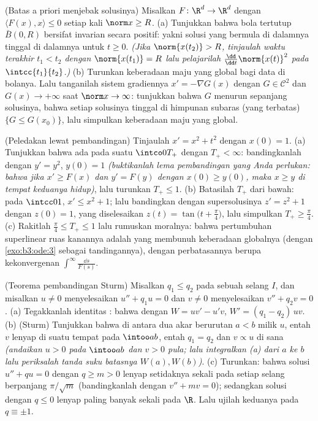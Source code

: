 \begin{exercise}[$\star\star\star$]\label{exo:b3:ode:10}
(Batas a priori menjebak solusinya) Misalkan $F \colon \R^d \to \R^d$
 dengan $\langle F(x), x\rangle \leq 0$
setiap kali $\norm x \geq R$.
(a) Tunjukkan bahwa bola tertutup $\bar B(0, R)$ bersifat invarian
secara positif: yakni solusi yang bermula di dalamnya tinggal di dalamnya untuk $t \geq
0$. \emph{(Jika $\norm{x(t_2)} > R$, tinjaulah waktu terakhir
$t_1 < t_2$ dengan $\norm{x(t_1)} = R$ lalu pelajarilah
$\frac{\dd}{\dd t}\norm{x(t)}^2$ pada $\intcc{t_1}{t_2}$.)}
(b) Turunkan keberadaan maju yang global bagi data di bolanya.
Lalu tanganilah sistem gradiennya $x' = -\nabla G(x)$ dengan $G \in
\mathcal C^2$ dan $G(x) \to +\infty$ saat $\norm x \to
\infty$: tunjukkan bahwa $G$ menurun sepanjang solusinya, bahwa setiap
solusinya tinggal di himpunan subaras (yang terbatas) $\{G \leq
G(x_0)\}$, lalu simpulkan keberadaan maju yang global.
\end{exercise}

\begin{exercise}[$\star\star$]\label{exo:b3:ode:11}
(Peledakan lewat pembandingan) Tinjaulah $x' = x^2 + t^2$ dengan $x(0) =
1$.
(a) Tunjukkan bahwa  ada pada suatu $\intco0{T_+}$
dengan $T_+ < \infty$: bandingkanlah dengan $y' = y^2$, $y(0) = 1$
\emph{(buktikanlah lema pembandingan yang Anda perlukan: bahwa jika $x' \geq
F(x)$ dan $y' = F(y)$ dengan $x(0) \geq y(0)$, maka $x \geq
y$ di tempat keduanya hidup)}, lalu turunkan $T_+ \leq 1$.
(b) Batasilah $T_+$ dari bawah: pada $\intcc01$, $x' \leq x^2 +
1$; lalu bandingkan dengan supersolusinya $z' = z^2 + 1$ dengan $z(0) =
1$, yang diselesaikan $z(t) = \tan\bigl(t + \frac\pi4\bigr)$, lalu
simpulkan $T_+ \geq \frac\pi4$.
(c) Rakitlah $\frac\pi4 \leq T_+ \leq 1$ lalu rumuskan
moralnya: bahwa pertumbuhan superlinear ruas kanannya adalah yang
membunuh keberadaan globalnya (dengan \cref{exo:b3:ode:3} sebagai
tandingannya), dengan perbatasannya berupa kekonvergenan
$\int^{\infty}\frac{\dd s}{F(s)}$.
\end{exercise}

\begin{exercise}[$\star\star\star$]\label{exo:b3:ode:12}
(Teorema pembandingan Sturm) Misalkan $q_1 \leq q_2$ 
pada sebuah selang $I$, dan misalkan $u \neq 0$ menyelesaikan $u''
+ q_1u = 0$ dan $v \neq 0$ menyelesaikan $v'' + q_2v = 0$.
(a) Tegakkanlah identitas : bahwa dengan $W = uv' - u'v$,
$W' = (q_1 - q_2)\,uv$.
(b) (Sturm) Tunjukkan bahwa di antara dua akar berurutan $a < b$
milik $u$, entah $v$ lenyap di suatu tempat pada $\intoo ab$, entah
$q_1 = q_2$ dan $v \propto u$ di sana \emph{(andaikan $u > 0$
pada $\intoo ab$ dan $v > 0$ pula; lalu integralkan (a) dari $a$ ke
$b$ lalu periksalah tanda suku batasnya $W(a),
W(b)$)}.
(c) Turunkan: bahwa solusi $u'' + qu = 0$ dengan $q \geq m > 0$
lenyap setidaknya sekali pada setiap selang berpanjang
$\pi/\sqrt m$ (bandingkanlah dengan $v'' + mv = 0$); sedangkan solusi dengan
$q \leq 0$ lenyap paling banyak sekali pada $\R$. Lalu ujilah keduanya pada
$q \equiv \pm1$.
\end{exercise}

